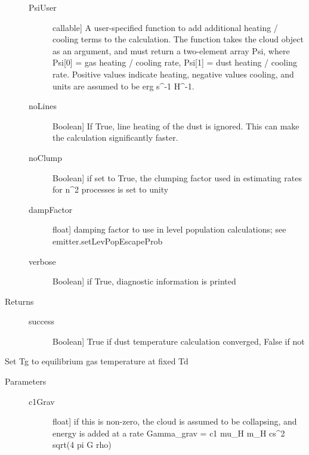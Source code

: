 \documentclass[letterpaper,10pt,english]{sphinxmanual}
\begin{document}
\begin{fulllineitems}
\begin{fulllineitems}
\begin{description}
\begin{description}
\item[{PsiUser}] \leavevmode{[}callable{]}
A user-specified function to add additional heating /
cooling terms to the calculation. The function takes the
cloud object as an argument, and must return a two-element
array Psi, where Psi{[}0{]} = gas heating / cooling rate,
Psi{[}1{]} = dust heating / cooling rate. Positive values
indicate heating, negative values cooling, and units are
assumed to be erg s\textasciicircum{}-1 H\textasciicircum{}-1.

\item[{noLines}] \leavevmode{[}Boolean{]}
If True, line heating of the dust is ignored. This can
make the calculation significantly faster.

\item[{noClump}] \leavevmode{[}Boolean{]}
if set to True, the clumping factor used in estimating
rates for n\textasciicircum{}2 processes is set to unity

\item[{dampFactor}] \leavevmode{[}float{]}
damping factor to use in level population calculations;
see emitter.setLevPopEscapeProb

\item[{verbose}] \leavevmode{[}Boolean{]}
if True, diagnostic information is printed

\end{description}

\item[{Returns}] \leavevmode\begin{description}
\item[{success}] \leavevmode{[}Boolean{]}
True if dust temperature calculation converged, False if
not

\end{description}

\end{description}

\end{fulllineitems}


\begin{fulllineitems}
\label{fulldoc:despotic.cloud.setGasTempEq}
Set Tg to equilibrium gas temperature at fixed Td
\begin{description}
\item[{Parameters}] \leavevmode\begin{description}
\item[{c1Grav}] \leavevmode{[}float{]}
if this is non-zero, the cloud is assumed to be
collapsing, and energy is added at a rate
Gamma\_grav = c1 mu\_H m\_H cs\textasciicircum{}2 sqrt(4 pi G rho)


\end{description}
\end{description}
\end{fulllineitems}
\end{fulllineitems}
\end{document}
